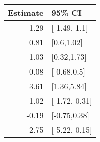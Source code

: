 \begin{tabular}{rl}
  \hline
Estimate & 95\% CI \\ 
  \hline
-1.29 & [-1.49,-1.1] \\ 
  0.81 & [0.6,1.02] \\ 
  1.03 & [0.32,1.73] \\ 
  -0.08 & [-0.68,0.5] \\ 
  3.61 & [1.36,5.84] \\ 
  -1.02 & [-1.72,-0.31] \\ 
  -0.19 & [-0.75,0.38] \\ 
  -2.75 & [-5.22,-0.15] \\ 
   \hline
\end{tabular}

